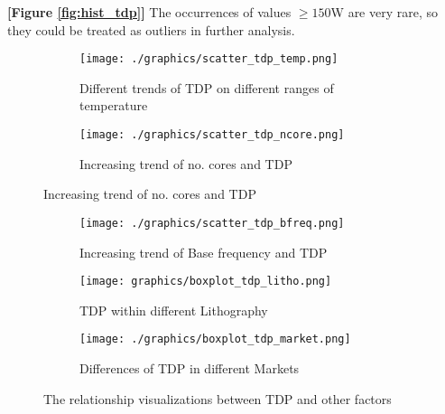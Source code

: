 \textbf{[Figure \ref{fig:hist_tdp}]} The occurrences of values $\ge 150$W are very rare, 
so they could be treated as outliers in further analysis.









\begin{figure}[H]
    \centering
    \begin{subfigure}[b]{0.49\textwidth}
        \centering
        \texttt{[image: ./graphics/scatter\_tdp\_temp.png]}
        \caption{Different trends of TDP on different ranges of temperature}
        \label{fig:tdp_analysis_temp}
    \end{subfigure}
    \begin{subfigure}[b]{0.49\textwidth}
        \centering
        \texttt{[image: ./graphics/scatter\_tdp\_ncore.png]}
        \caption{Increasing trend of no. cores and TDP}
        \label{fig:tdp_analysis_ncore}
    \end{subfigure}
\end{figure}

\begin{figure}[!h]
\centering
    \begin{subfigure}[b]{0.49\textwidth}
        \centering
        \texttt{[image: ./graphics/scatter\_tdp\_bfreq.png]}
        \caption{Increasing trend of Base frequency and TDP}
        \label{fig:tdp_analysis_bfreq}
    \end{subfigure}
    \begin{subfigure}[b]{0.49\textwidth}
        \centering
        \texttt{[image: graphics/boxplot\_tdp\_litho.png]}
        \caption{TDP within different Lithography}
        \label{fig:tdp_analysis_litho}
    \end{subfigure}
    \hfill
    \begin{subfigure}[b]{0.49\textwidth}
       \centering
       \texttt{[image: ./graphics/boxplot\_tdp\_market.png]}
       \caption{Differences of TDP in different Markets}
       \label{fig:tdp_analysis_market}
    \end{subfigure}

    \caption{The relationship visualizations between TDP and other factors}
    \label{fig:tdp_analysis}
\end{figure}

